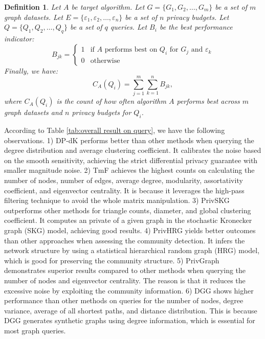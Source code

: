 \documentclass[conference]{IEEEtran}
\theoremstyle{plain}
\newtheorem{definition}{Definition}
\begin{document}
\begin{definition}
\label{def:overall metric on query}
Let $A$ be target algorithm.
Let $G = \{G_1, G_2, \ldots, G_{m}\}$ be a set of $m$ graph datasets. 
Let $E = \{\varepsilon_1, \varepsilon_2, \ldots, \varepsilon_{n}\}$ be a set of $n$ privacy budgets. 
Let $Q = \{Q_1, Q_2, \ldots, Q_{q}\}$ be a set of $q$ queries. 
Let \( B_{i} \)  be the best performance indicator:
   \[
   B_{jk} = 
   \begin{cases} 
   1 & \text{if } A \text{ performs best on } Q_i \text{ for } G_j \text{ and } \varepsilon_k \\
   0 & \text{otherwise}
   \end{cases}
   \]
Finally, we have:
   \[
   C_A(Q_i) = \sum_{j=1}^{m}\sum_{k=1}^{n} B_{jk},
   \]
where \( C_A(Q_i)  \) is the count of how often algorithm \( A \) performs best across $m$ graph datasets and $n$ privacy budgets for $Q_i$.
\end{definition}

According to Table \ref{tab:overall result on query}, we have the following observations.
1) DP-dK performs better than other methods when querying the degree distribution and average clustering coefficient.
It calibrates the noise based on the smooth sensitivity, achieving the strict differential privacy guarantee with smaller magnitude noise.
2) TmF achieves the highest counts on calculating the number of nodes, number of edges, average degree, modularity, assortativity coefficient, and eigenvector centrality.
It is because it leverages the high-pass filtering technique to avoid the whole matrix manipulation.
3) PrivSKG outperforms other methods for triangle counts, diameter, and global clustering coefficient.
It computes an private of a given graph in the stochastic Kronecker graph (SKG) model, achieving good results.
4) PrivHRG yields better outcomes than other approaches when assessing the community detection.
It infers the network structure by using a statistical hierarchical random graph (HRG) model, which is good for preserving the community structure.
5) PrivGraph demonstrates superior results compared to other methods when querying the number of nodes and eigenvector centrality.
The reason is that it reduces the excessive noise by exploiting the community information.
6) DGG shows higher performance than other methods on queries for the number of nodes, degree variance, average of all shortest paths, and distance distribution.
This is because DGG generates synthetic graphs using degree information, which is essential for most graph queries.
\end{document}

